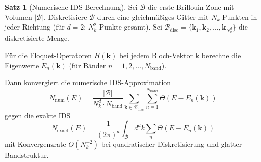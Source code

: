 \documentclass[a4paper,12pt]{article}
\theoremstyle{definition}
\newtheorem{satz}{Satz}[section]
\begin{document}
\begin{satz}[Numerische IDS-Berechnung]\label{satz:numerische_ids}
	Sei $\mathcal{B}$ die erste Brillouin-Zone mit Volumen $|\mathcal{B}|$. Diskretisiere $\mathcal{B}$ durch eine gleichmäßiges Gitter mit $N_k$ Punkten in jeder Richtung (für $d=2$: $N_k^2$ Punkte gesamt). Sei $\mathcal{B}_{\text{disc}} = \{\mathbf{k}_1, \mathbf{k}_2, \ldots, \mathbf{k}_{N_k^d}\}$ die diskretisierte Menge.
	
	Für die Floquet-Operatoren $H(\mathbf{k})$ bei jedem Bloch-Vektor $\mathbf{k}$ berechne die Eigenwerte $E_n(\mathbf{k})$ (für Bänder $n = 1, 2, \ldots, N_{\text{band}}$).
	
	Dann konvergiert die numerische IDS-Approximation
	\[
	N_{\text{num}}(E) = \frac{|\mathcal{B}|}{N_k^d \cdot N_{\text{band}}} \sum_{\mathbf{k} \in \mathcal{B}_{\text{disc}}} \sum_{n=1}^{N_{\text{band}}} \Theta(E - E_n(\mathbf{k}))
	\]
	gegen die exakte IDS
	\[
	N_{\text{exact}}(E) = \frac{1}{(2\pi)^d} \int_{\mathcal{B}} d^d k \sum_{n} \Theta(E - E_n(\mathbf{k}))
	\]
	mit Konvergenzrate $O(N_k^{-2})$ bei quadratischer Diskretisierung und glatter Bandstruktur.
\end{satz}
\end{document}
